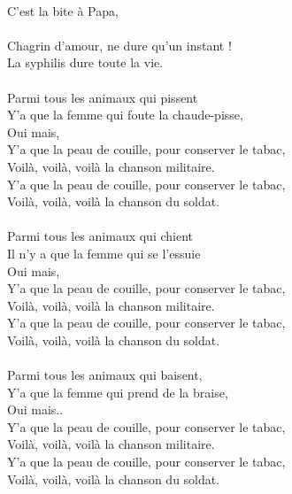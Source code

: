 \\C'est la bite à Papa,
\\\\Chagrin d'amour, ne dure qu'un instant !
\\La syphilis dure toute la vie.
\\\\Parmi tous les animaux qui pissent
\\Y'a que la femme qui foute la chaude-pisse,
\\Oui mais, 
\\Y'a que la peau de couille, pour conserver le tabac,
\\Voilà, voilà, voilà la chanson militaire.
\\Y'a que la peau de couille, pour conserver le tabac,
\\Voilà, voilà, voilà la chanson du soldat.
\\\\Parmi tous les animaux qui chient
\\Il n'y a que la femme qui se l'essuie
\\Oui mais,
\\Y'a que la peau de couille, pour conserver le tabac,
\\Voilà, voilà, voilà la chanson militaire.
\\Y'a que la peau de couille, pour conserver le tabac,
\\Voilà, voilà, voilà la chanson du soldat.
\\\\Parmi tous les animaux qui baisent,
\\Y'a que la femme qui prend de la braise,
\\Oui mais..
\\Y'a que la peau de couille, pour conserver le tabac,
\\Voilà, voilà, voilà la chanson militaire.
\\Y'a que la peau de couille, pour conserver le tabac,
\\Voilà, voilà, voilà la chanson du soldat.

\breakpage